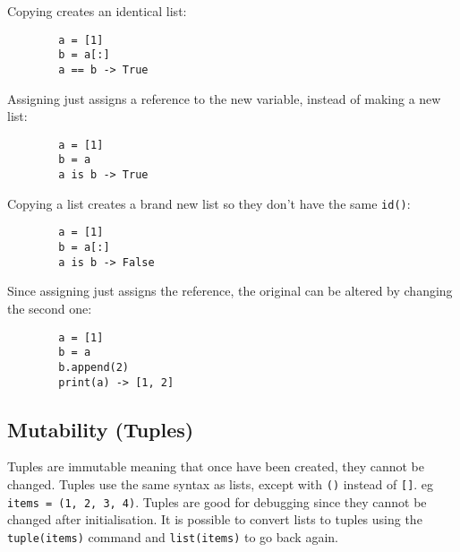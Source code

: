 \noindent
Copying creates an identical list:

\begin{center}
	\begin{verbatim}
        a = [1]
        b = a[:]
        a == b -> True
    \end{verbatim}
\end{center}

\noindent
Assigning just assigns a reference to the new variable, instead of making a new list:

\begin{center}
	\begin{verbatim}
        a = [1]
        b = a
        a is b -> True
    \end{verbatim}
\end{center}

\noindent
Copying a list creates a brand new list so they don't have the same \texttt{id()}:

\begin{center}
	\begin{verbatim}
        a = [1]
        b = a[:]
        a is b -> False
    \end{verbatim}
\end{center}

\noindent
Since assigning just assigns the reference, the original can be altered by changing the second one:

\begin{center}
	\begin{verbatim}
        a = [1]
        b = a
        b.append(2)
        print(a) -> [1, 2]
    \end{verbatim}
\end{center}

\subsection{Mutability (Tuples)}\label{sub:mutability_tuples_}

Tuples are immutable meaning that once have been created, they cannot be changed.
Tuples use the same syntax as lists, except with \texttt{()} instead of \texttt{[]}. eg \texttt{items = (1, 2, 3, 4)}.
Tuples are good for debugging since they cannot be changed after initialisation.
It is possible to convert lists to tuples using the \texttt{tuple(items)} command and \texttt{list(items)} to go back again.

